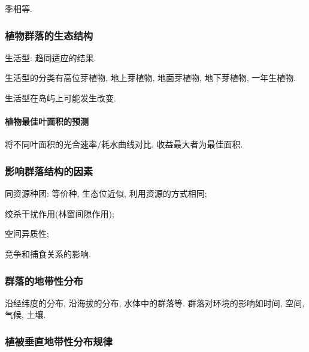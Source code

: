 \documentclass{ctexart}
\begin{document}
季相等.


\subsubsection{植物群落的生态结构} %
\label{ssub:植物群落的生态结构}

生活型: 趋同适应的结果.
\par
生活型的分类有高位芽植物, 地上芽植物, 地面芽植物, 地下芽植物, 一年生植物.
\par
生活型在岛屿上可能发生改变.

\paragraph{植物最佳叶面积的预测} %
\label{par:植物最佳叶面积的预测}

将不同叶面积的光合速率/耗水曲线对比, 收益最大者为最佳面积.



\subsubsection{影响群落结构的因素} %
\label{ssub:影响群落结构的因素}

\begin{cenum}
    \item 同资源种团: 等价种, 生态位近似, 利用资源的方式相同;
    \item 绞杀干扰作用(林窗间隙作用);
    \item 空间异质性;
    \item 竞争和捕食关系的影响.
\end{cenum}


\subsubsection{群落的地带性分布} %
\label{ssub:群落的地带性分布}

沿经纬度的分布, 沿海拔的分布, 水体中的群落等. 群落对环境的影响如时间, 空间, 气候, 土壤.


\subsubsection{植被垂直地带性分布规律} %
\label{ssub:植被垂直地带性分布规律}
\end{document}
